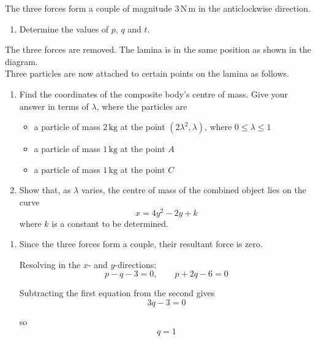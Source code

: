 \documentclass[leqno]{article}
\begin{document}
\begin{enumerate}[
  label=\textbf{\arabic*.},
  leftmargin=*,
  topsep=0pt,
  partopsep=0pt,
  parsep=0pt
]
The three forces form a couple of magnitude $3\,\mathrm{N\,m}$ in the anticlockwise direction. \\

\begin{enumerate}[label=\textbf{(\alph*)}]
  \item Determine the values of $p$, $q$ and $t$.  \\
\end{enumerate}

The three forces are removed. The lamina is in the same position as shown in the diagram. \\

Three particles are now attached to certain points on the lamina as follows. \\

\begin{enumerate}[label=\textbf{(\alph*)}, resume]
  \item Find the coordinates of the composite body's centre of mass. Give your answer in terms of $\lambda$, where the particles are
  \begin{itemize}
    \item a particle of mass $2\,\mathrm{kg}$ at the point $(2\lambda^2, \lambda)$, where $0 \le \lambda \le 1$
    \item a particle of mass $1\,\mathrm{kg}$ at the point $A$
    \item a particle of mass $1\,\mathrm{kg}$ at the point $C$
  \end{itemize}
  \item Show that, as $\lambda$ varies, the centre of mass of the combined object lies on the curve
  \[
  x = 4y^2 - 2y + k
  \]
  where $k$ is a constant to be determined.  \\
\end{enumerate}

\vspace*{20pt}

\begin{djsSolution}
\begin{enumerate}[label=\textbf{(\alph*)}, start=1]
  \item Since the three forces form a couple, their resultant force is zero.

  Resolving in the $x$- and $y$-directions:
  \[
  p-q-3=0,
  \qquad
  p+2q-6=0
  \]

  Subtracting the first equation from the second gives
  \[
  3q-3=0
  \]

  so
  \[
  q=1
  \]


\end{enumerate}
\end{djsSolution}
\end{enumerate}
\end{document}
